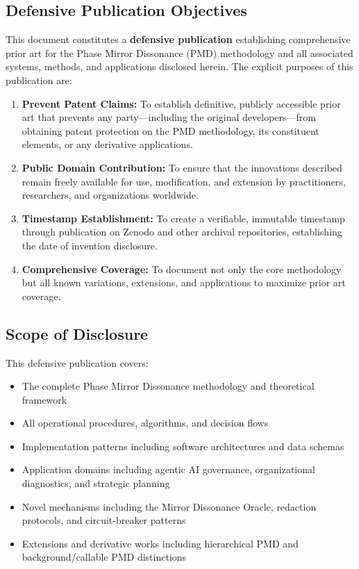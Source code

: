 \documentclass[11pt,a4paper]{article}
\begin{document}
\subsection{Defensive Publication Objectives}

This document constitutes a \textbf{defensive publication} establishing comprehensive prior art for the Phase Mirror Dissonance (PMD) methodology and all associated systems, methods, and applications disclosed herein. The explicit purposes of this publication are:

\begin{enumerate}
\item \textbf{Prevent Patent Claims:} To establish definitive, publicly accessible prior art that prevents any party—including the original developers—from obtaining patent protection on the PMD methodology, its constituent elements, or any derivative applications.

\item \textbf{Public Domain Contribution:} To ensure that the innovations described remain freely available for use, modification, and extension by practitioners, researchers, and organizations worldwide.

\item \textbf{Timestamp Establishment:} To create a verifiable, immutable timestamp through publication on Zenodo and other archival repositories, establishing the date of invention disclosure.

\item \textbf{Comprehensive Coverage:} To document not only the core methodology but all known variations, extensions, and applications to maximize prior art coverage.
\end{enumerate}

\subsection{Scope of Disclosure}

This defensive publication covers:

\begin{itemize}
\item The complete Phase Mirror Dissonance methodology and theoretical framework
\item All operational procedures, algorithms, and decision flows
\item Implementation patterns including software architectures and data schemas
\item Application domains including agentic AI governance, organizational diagnostics, and strategic planning
\item Novel mechanisms including the Mirror Dissonance Oracle, redaction protocols, and circuit-breaker patterns
\item Extensions and derivative works including hierarchical PMD and background/callable PMD distinctions
\end{itemize}
\end{document}
